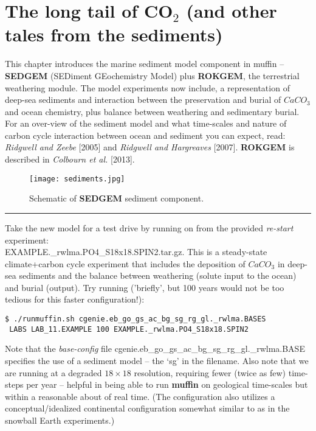 \documentclass[11pt,fleqn]{book} %
\begin{document}

\newpage


\section{The long tail of CO$_{2}$ (and other tales from the sediments)}

This chapter introduces the marine sediment model component in muffin -- \textbf{SEDGEM} (SEDiment GEochemistry Model) plus \textbf{ROKGEM}, the terrestrial weathering module. The model experiments now include, a representation of deep-sea sediments and interaction between the preservation and burial of \(CaCO_{3}\) and ocean chemistry, plus balance between weathering and sedimentary burial. For an over-view of the sediment model and what time-scales and nature of carbon cycle interaction between ocean and sediment you can expect, read: \textit{Ridgwell and Zeebe} [2005] and \textit{Ridgwell and Hargreaves} [2007]. \textbf{ROKGEM} is described in \textit{Colbourn et al.} [2013].

\begin{figure}
\texttt{[image: sediments.jpg]}
\caption{Schematic of \textbf{SEDGEM} sediment component.}
\label{fig:sediments}
\end{figure}

\vspace{1mm}
\noindent\rule{4cm}{0.1mm}
\vspace{2mm}

\noindent Take the new model for a test drive by running on from the provided \textit{re-start} experiment: \\ \textsf{\footnotesize EXAMPLE.\_rwlma.PO4\_S18x18.SPIN2.tar.gz}. This is a steady-state climate+carbon cycle experiment that includes the deposition of \(CaCO_{3}\) in deep-sea sediments and the balance between weathering (solute input to the ocean) and burial (output). Try running ('briefly', but 100 years would not be too tedious for this faster configuration!):
\vspace{-2mm}\begin{verbatim}
$ ./runmuffin.sh cgenie.eb_go_gs_ac_bg_sg_rg_gl._rwlma.BASES
 LABS LAB_11.EXAMPLE 100 EXAMPLE._rwlma.PO4_S18x18.SPIN2
\end{verbatim}\vspace{-2mm}
Note that the \textit{base-config} file \textsf{\footnotesize cgenie.eb\_go\_gs\_ac\_bg\_sg\_rg\_gl.\_rwlma.BASE} specifies the use of a sediment model -- the ‘\textsf{\footnotesize sg}’ in the filename.
Also note that we are running at a degraded \(18\times18\) resolution, requiring fewer (twice as few) time-steps per year -- helpful in being able to run \textbf{muffin} on geological time-scales but within a reasonable about of real time. (The configuration also utilizes a conceptual/idealized continental configuration somewhat similar to as in the snowball Earth experiments.)
\end{document}
